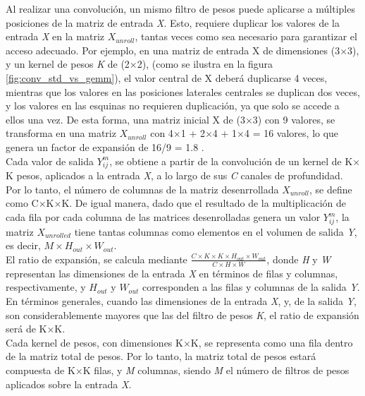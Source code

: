 Al realizar una convolución, un mismo filtro de pesos puede aplicarse a múltiples posiciones de la matriz de entrada \textit{X}. Esto, requiere duplicar los valores de la entrada \textit{X} en la matriz $X_{unroll}$, tantas veces como sea necesario para garantizar el acceso adecuado. Por ejemplo, en una matriz de entrada X de dimensiones (3$\times$3), y un kernel de pesos \textit{K} de (2$\times$2), (como se ilustra en la figura \ref{fig:conv_std_vs_gemm}), el valor central de X deberá duplicarse 4 veces, mientras que los valores en las posiciones laterales centrales se duplican dos veces, y los valores en las esquinas no requieren duplicación, ya que solo se accede a ellos una vez. De esta forma, una matriz inicial X de (3$\times$3) con 9 valores, se transforma en una matriz $X_{unroll}$ con 4$\times$1 + 2$\times$4 + 1$\times$4 = 16 valores, lo que genera un factor de expansión de 16/9 = 1.8 . \\
Cada valor de salida $Y^m_{ij}$, se obtiene a partir de la convolución de un kernel de K$\times$K pesos, aplicados a la entrada \textit{X}, a lo largo de sus \textit{C} canales de profundidad. Por lo tanto, el número de columnas de la matriz desenrrollada $X_{unroll}$, se define como C$\times$K$\times$K. De igual manera, dado que el resultado de la multiplicación de cada fila por cada columna de las matrices desenrolladas genera un valor $Y^m_{ij}$, la matriz $X_{unrolled}$ tiene tantas columnas como elementos en el volumen de salida \textit{Y}, es decir, $M \times H_{out} \times W_{out}$. \\
El ratio de expansión, se calcula mediante $\frac{C \times K \times K \times H_{out} \times W_{out}}{C \times H \times W}$, donde \textit{H} y \textit{W} representan las dimensiones de la entrada \textit{X} en términos de filas y columnas, respectivamente, y $H_{out}$ y $W_{out}$ corresponden a las filas y columnas de la salida \textit{Y}. En términos generales, cuando las dimensiones de la entrada \textit{X}, y, de la salida \textit{Y}, son considerablemente mayores que las del filtro de pesos \textit{K}, el ratio de expansión será de K$\times$K. \\
Cada kernel de pesos, con dimensiones K$\times$K, se representa como una fila dentro de la matriz total de pesos. Por lo tanto, la matriz total de pesos estará compuesta de K$\times$K filas, y \textit{M} columnas, siendo \textit{M} el número de filtros de pesos aplicados sobre la entrada \textit{X}. \\
